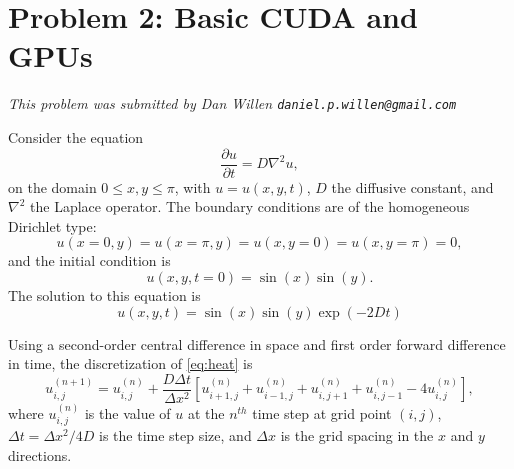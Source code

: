 \documentclass[11pt]{article}
\begin{document}
  \section{Problem 2:  Basic CUDA and GPUs}
    \textit{This problem was submitted by Dan Willen \texttt{daniel.p.willen@gmail.com}}

    Consider the equation
    \begin{equation}\label{eq:heat}
      \frac{\partial u}{\partial t} = D \nabla^2 u,
    \end{equation}
    on the domain \(0 \leq x,y \leq \pi\), with \(u = u(x,y,t)\), \(D\) the diffusive constant, and \(\nabla^2\) the Laplace operator.
    The boundary conditions are of the homogeneous Dirichlet type:
    \begin{equation}
      u(x = 0, y) = u(x = \pi, y) = u(x, y = 0) = u(x, y = \pi) = 0,
    \end{equation}
    and the initial condition is
    \begin{equation}
      u(x,y, t = 0) = \sin(x) \sin(y).
    \end{equation}
    The solution to this equation is
    \begin{equation}
      u(x,y,t) = \sin(x) \sin(y) \exp{(-2Dt)}
    \end{equation}
    
    Using a second-order central difference in space and first order forward difference in time, the discretization of \eqref{eq:heat} is
    \begin{equation}
      u_{i,j}^{\left(n+1\right)} = u_{i,j}^{\left(n\right)} + \frac{D \Delta t}{\Delta x^2} 
        \left[u_{i+1, j}^{\left(n\right)} +
              u_{i-1, j}^{\left(n\right)} +
              u_{i, j+1}^{\left(n\right)} +
              u_{i, j-1}^{\left(n\right)} -
              4u_{i, j}^{\left(n\right)} \right],
    \end{equation}
    where \(u_{i,j}^{\left(n\right)}\) is the value of \(u\) at the \(n^{th}\) time step at grid point \((i,j)\), \(\Delta t = \Delta x^2 / 4D\) is the time step size, and \(\Delta x\) is the grid spacing in the \(x\) and \(y\) directions.
    
    \vspace{5mm}
    
\end{document}
